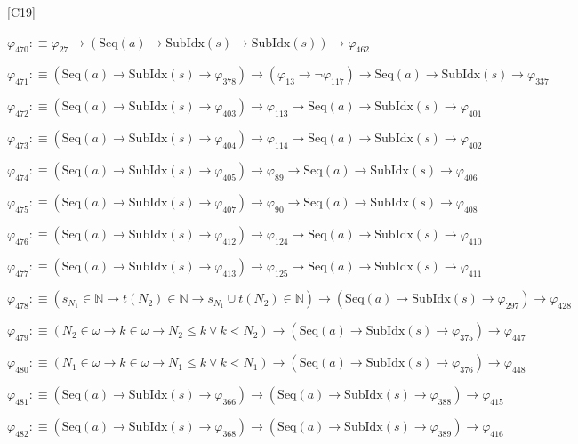 \begin{fullproof}{[C19]}
\begin{abbrevlist}
\item $\varphi_{470} :\equiv \varphi_{27} \to (\mathrm{Seq}(a) \to \mathrm{SubIdx}(s) \to \mathrm{SubIdx}(s)) \to \varphi_{462}$
\item $\varphi_{471} :\equiv (\mathrm{Seq}(a) \to \mathrm{SubIdx}(s) \to \varphi_{378}) \to (\varphi_{13} \to \neg \varphi_{117}) \to \mathrm{Seq}(a) \to \mathrm{SubIdx}(s) \to \varphi_{337}$
\item $\varphi_{472} :\equiv (\mathrm{Seq}(a) \to \mathrm{SubIdx}(s) \to \varphi_{403}) \to \varphi_{113} \to \mathrm{Seq}(a) \to \mathrm{SubIdx}(s) \to \varphi_{401}$
\item $\varphi_{473} :\equiv (\mathrm{Seq}(a) \to \mathrm{SubIdx}(s) \to \varphi_{404}) \to \varphi_{114} \to \mathrm{Seq}(a) \to \mathrm{SubIdx}(s) \to \varphi_{402}$
\item $\varphi_{474} :\equiv (\mathrm{Seq}(a) \to \mathrm{SubIdx}(s) \to \varphi_{405}) \to \varphi_{89} \to \mathrm{Seq}(a) \to \mathrm{SubIdx}(s) \to \varphi_{406}$
\item $\varphi_{475} :\equiv (\mathrm{Seq}(a) \to \mathrm{SubIdx}(s) \to \varphi_{407}) \to \varphi_{90} \to \mathrm{Seq}(a) \to \mathrm{SubIdx}(s) \to \varphi_{408}$
\item $\varphi_{476} :\equiv (\mathrm{Seq}(a) \to \mathrm{SubIdx}(s) \to \varphi_{412}) \to \varphi_{124} \to \mathrm{Seq}(a) \to \mathrm{SubIdx}(s) \to \varphi_{410}$
\item $\varphi_{477} :\equiv (\mathrm{Seq}(a) \to \mathrm{SubIdx}(s) \to \varphi_{413}) \to \varphi_{125} \to \mathrm{Seq}(a) \to \mathrm{SubIdx}(s) \to \varphi_{411}$
\item $\varphi_{478} :\equiv (s_{N_{1}} \in \mathbb{N} \to t(N_{2}) \in \mathbb{N} \to s_{N_{1}} \cup t(N_{2}) \in \mathbb{N}) \to (\mathrm{Seq}(a) \to \mathrm{SubIdx}(s) \to \varphi_{297}) \to \varphi_{428}$
\item $\varphi_{479} :\equiv (N_{2} \in \omega \to k \in \omega \to N_{2} \leq k \lor k < N_{2}) \to (\mathrm{Seq}(a) \to \mathrm{SubIdx}(s) \to \varphi_{375}) \to \varphi_{447}$
\item $\varphi_{480} :\equiv (N_{1} \in \omega \to k \in \omega \to N_{1} \leq k \lor k < N_{1}) \to (\mathrm{Seq}(a) \to \mathrm{SubIdx}(s) \to \varphi_{376}) \to \varphi_{448}$
\item $\varphi_{481} :\equiv (\mathrm{Seq}(a) \to \mathrm{SubIdx}(s) \to \varphi_{366}) \to (\mathrm{Seq}(a) \to \mathrm{SubIdx}(s) \to \varphi_{388}) \to \varphi_{415}$
\item $\varphi_{482} :\equiv (\mathrm{Seq}(a) \to \mathrm{SubIdx}(s) \to \varphi_{368}) \to (\mathrm{Seq}(a) \to \mathrm{SubIdx}(s) \to \varphi_{389}) \to \varphi_{416}$

\end{abbrevlist}
\end{fullproof}
